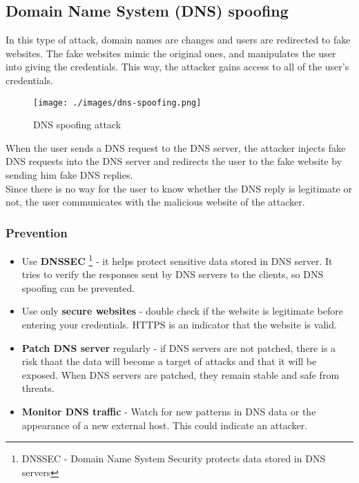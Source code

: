 \newpage

\subsection{Domain Name System (DNS) spoofing}
In this type of attack, domain names are changes and users are redirected to fake websites. 
The fake websites mimic the original ones, and manipulates the user into giving the credentials. 
This way, the attacker gains access to all of the user's credentials. \\

\begin{figure}[H]
    \centering
    \texttt{[image: ./images/dns-spoofing.png]}
    \caption{DNS spoofing attack} 
\end{figure}

When the user sends a DNS request to the DNS server, the attacker injects fake DNS requests into the DNS server and redirects the user to the fake website by sending him fake DNS replies. \\
Since there is no way for the user to know whether the DNS reply is legitimate or not, the user communicates with the malicious website of the attacker.

\subsubsection{Prevention}
\begin{itemize}
    \item Use \textbf{DNSSEC} \footnote{DNSSEC - Domain Name System Security protects data stored in DNS servers} - it helps protect sensitive data stored in DNS server.  It tries to verify the responses sent by DNS servers to the clients, so DNS spoofing can be prevented.
    \item Use only \textbf{secure websites} - double check if the website is legitimate before entering your credentials. HTTPS is an indicator that the website is valid.
    \item \textbf{Patch DNS server} regularly - if DNS servers are not patched, there is a risk thaat the data will become a target of attacks and that it will be exposed. When DNS servers are patched, they remain stable and safe from threats.
    \item \textbf{Monitor DNS traffic} - Watch for new patterns in DNS data or the appearance of a new external host. This could indicate an attacker.
\end{itemize}

